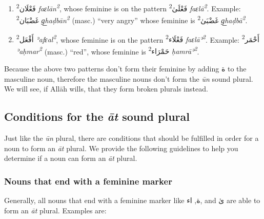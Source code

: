 \documentclass[
  10pt,
]{book}
\providecommand{\tightlist}{%
  \setlength{\itemsep}{0pt}\setlength{\parskip}{0pt}}
\begin{document}
\begin{enumerate}
\def\labelenumi{\roman{enumi}.}
\tightlist
\item
  \foreignlanguage{arabic}{فَعْلَان\textsuperscript{2}} \emph{faɛlān\textsuperscript{2}}, whose feminine is on the pattern \foreignlanguage{arabic}{فَعْلَىٰ\textsuperscript{2}} \emph{faɛlā\textsuperscript{2}}. Example: \foreignlanguage{arabic}{غَضْبَان\textsuperscript{2}} \emph{g͟haḍbān\textsuperscript{2}} (masc.) \enquote{very angry} whose feminine is \foreignlanguage{arabic}{غَضْبَىٰ\textsuperscript{2}} \emph{g͟haḍbā\textsuperscript{2}}.
\item
  \foreignlanguage{arabic}{أَفْعَل\textsuperscript{2}} \emph{ʾafɛal\textsuperscript{2}}, whose feminine is on the pattern \foreignlanguage{arabic}{فَعْلَاء\textsuperscript{2}} \emph{faɛlāʾ\textsuperscript{2}}. Example: \foreignlanguage{arabic}{أَحْمَر\textsuperscript{2}} \emph{ʾaḥmar\textsuperscript{2}} (masc.) \enquote{red}, whose feminine is \foreignlanguage{arabic}{حَمْرَاء\textsuperscript{2}} \emph{ḥamrāʾ\textsuperscript{2}}.
\end{enumerate}

Because the above two patterns don't form their feminine by adding \foreignlanguage{arabic}{ة} to the masculine noun, therefore the masculine nouns don't form the \emph{ūn} sound plural. We will see, if Allāh wills, that they form broken plurals instead.

\subsection{\texorpdfstring{Conditions for the \emph{āt} sound plural}{Conditions for the āt sound plural}}\label{conditions-for-the-at-plural}

Just like the \emph{ūn} plural, there are conditions that should be fulfilled in order for a noun to form an \emph{āt} plural.
We provide the following guidelines to help you determine if a noun can form an \emph{āt} plural.

\subsubsection{Nouns that end with a feminine marker}\label{nouns-that-end-with-a-feminine-marker}

Generally, all nouns that end with a feminine marker like
\foreignlanguage{arabic}{ة}, \foreignlanguage{arabic}{اء}, and \foreignlanguage{arabic}{ىٰ}
are able to form an \emph{āt} plural.
Examples are:
\end{document}
